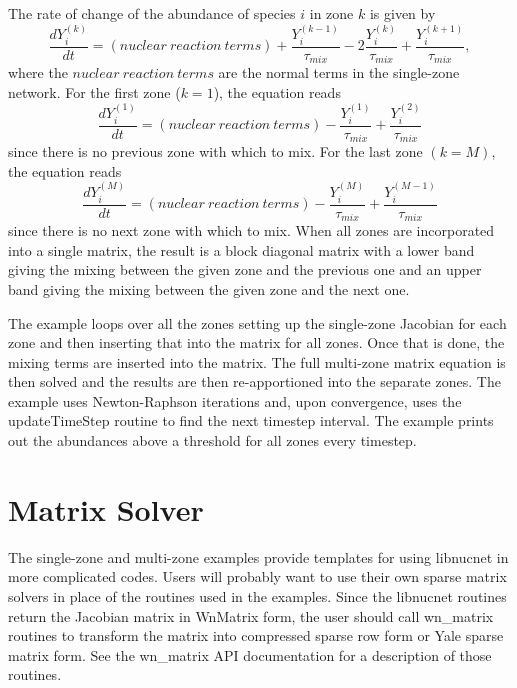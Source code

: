 \documentclass{article}    %
\begin{document}
The rate of change of the abundance of species $i$ in zone $k$ is
given by
\begin{equation}
\frac{dY_i^{(k)}}{dt} = (nuclear\ reaction\ terms) +
\frac{Y_i^{(k-1)}}{\tau_{mix}} - 2 \frac{Y_i^{(k)}}{\tau_{mix}} +
\frac{Y_i^{(k+1)}}{\tau_{mix}},  \label{eq:dydtmix}
\end{equation}
where the $nuclear\ reaction\ terms$ are the normal terms in the
single-zone network.  For the first zone ($k = 1$), the equation
reads
\begin{equation}
\frac{dY_i^{(1)}}{dt} = (nuclear\ reaction\ terms)
-\frac{Y_i^{(1)}}{\tau_{mix}} + \frac{Y_i^{(2)}}{\tau_{mix}}
\label{eq:dydtmix1}
\end{equation}
since there is no previous zone with which to mix.  For the last
zone $(k = M)$, the equation reads
\begin{equation}
\frac{dY_i^{(M)}}{dt} = (nuclear\ reaction\ terms)
-\frac{Y_i^{(M)}}{\tau_{mix}} + \frac{Y_i^{(M-1)}}{\tau_{mix}}
\label{eq:dydtmixM}
\end{equation}
since there is no next zone with which to mix.  When all zones are
incorporated into a single matrix, the result is a block diagonal
matrix with a lower band giving the mixing between the given zone
and the previous one and an upper band giving the mixing between the
given zone and the next one.

The example loops over all the zones setting up the single-zone
Jacobian for each zone and then inserting that into the matrix for
all zones.  Once that is done, the mixing terms are inserted into
the matrix.  The full multi-zone matrix equation is then solved and
the results are then re-apportioned into the separate zones.  The
example uses Newton-Raphson iterations and, upon convergence,
uses the updateTimeStep routine to find the next timestep
interval.  The example prints out the abundances above a threshold
for all zones every timestep.

\section{Matrix Solver}

The single-zone and multi-zone examples provide templates for using
libnucnet in more complicated codes.  Users will probably want to
use their own sparse matrix solvers in place of the routines
used in the examples.  Since the libnucnet routines return the
Jacobian matrix in WnMatrix form, the user should call wn\_matrix
routines to transform the matrix into compressed
sparse row form or Yale sparse matrix form.  See the wn\_matrix
API documentation for a description of those routines.
\end{document}
